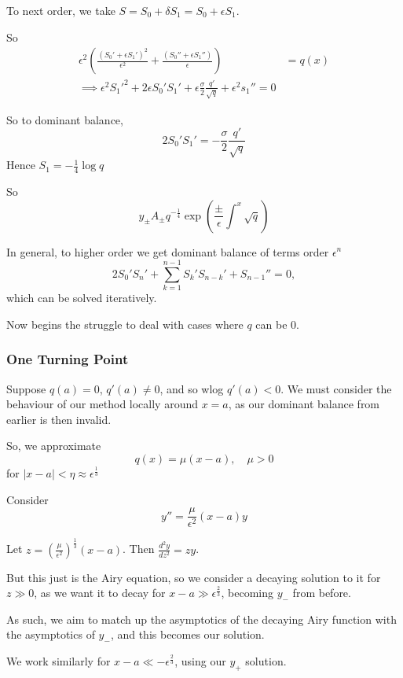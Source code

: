 \documentclass[a4paper]{article}
\begin{document}
To next order, we take $S = S_0 + \delta S_1 = S_0 + \epsilon S_1$.

So
\begin{align*}
	\epsilon^2 \left( \frac{(S_0' + \epsilon S_1')^2}{\epsilon^2} + \frac{(S_0'' + \epsilon S_1'')}{\epsilon} \right) &= q(x) \\
	\implies \epsilon^2 S_1'^2 + 2\epsilon S_0' S_1' + \epsilon \frac{\sigma}{2} \frac{q'}{\sqrt{q} } + \epsilon^2 s_1'' = 0
\end{align*}

So to dominant balance,
\[
2S_0' S_1' = -\frac{\sigma}{2}\frac{q'}{\sqrt{q}  }
\] 
Hence $S_1 = -\frac{1}{4} \log q$

So \[
	y_{\pm} A_{\pm} q^{-\frac{1}{4}} \exp\left( \frac{\pm}{\epsilon} \int ^{x} \sqrt{q}  \right) 
\] 

In general, to higher order we get dominant balance of terms order  $\epsilon^{n}$
\[
2S_0' S_n ' + \sum_{k=1}^{n-1} S_k' S_{n-k}' + S_{n-1}'' = 0
,\] which can be solved iteratively.

Now begins the struggle to deal with cases where $q$ can be $0$.

\subsubsection{One Turning Point}

Suppose $q(a) = 0$, $q'(a) \neq  0$, and so wlog $q'(a) < 0$. We must consider the behaviour of our method locally around  $x=a$, as our dominant balance from earlier is then invalid.

So, we approximate 
\[
	q(x) = \mu (x-a), \quad \mu > 0
\] for $|x-a| < \eta \approx \epsilon^{\frac{1}{3}}$

Consider
\[
	y'' = \frac{\mu}{\epsilon^2} (x-a) y
\]

Let $z = \left( \frac{\mu}{\epsilon^2} \right)^{\frac{1}{3}} (x-a) $. Then $\frac{d^2y}{dz^2} = zy$.

But this just is the Airy equation, so we consider a decaying solution to it for $z \gg 0$, as we want it to decay for $x-a \gg \epsilon^{\frac{2}{3}}$, becoming $y_{-}$ from before.

As such, we aim to match up the asymptotics of the decaying Airy function with the asymptotics of $y_{-}$, and this becomes our solution.

We work similarly for $x - a \ll -\epsilon^{\frac{2}{3}}$, using our $y_{+}$ solution.

\vspace{1em}
\end{document}
